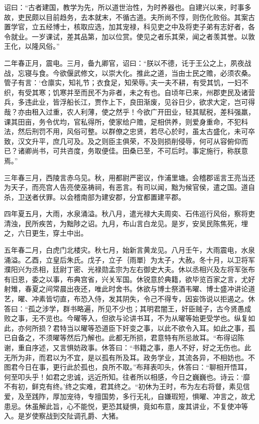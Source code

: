 \documentclass[12pt,UTF8]{ctexbook}
\begin{document}
诏曰：“古者建国，教学为先，所以道世治性，为时养器也。自建兴以来，时事多故，吏民颇以目前趋务，去本就末，不循古道。夫所尚不惇，则伤化败俗。其案古置学官，立五经博士，核取应选，加其宠禄，科见吏之中及将吏子弟有志好者，各令就业。一岁课试，差其品第，加以位赏。使见之者乐其荣，闻之者羡其誉。以敦王化，以隆风俗。”

二年春正月，震电。三月，备九卿官，诏曰：“朕以不德，讬于王公之上，夙夜战战，忘寝与食。今欲偃武修文，以崇大化。推此之道，当由士民之赡，必须农桑。管子有言：‘仓廪实，知礼节；衣食足，知荣辱。’夫一夫不耕，有受其饥，一妇不织，有受其寒；饥寒并至而民不为非者，未之有也。自顷年已来，州郡吏民及诸营兵，多违此业，皆浮船长江，贾作上下，良田渐废，见谷日少，欲求大定，岂可得哉？亦由租入过重，农人利薄，使之然乎！今欲广开田业，轻其赋税，差科强羸，课其田亩，务令优均，官私得所，使家给户赡，足相供养，则爱身重命，不犯科法，然后刑罚不用，风俗可整。以群僚之忠贤，若尽心於时，虽太古盛化，未可卒致，汉文升平，庶几可及。及之则臣主俱荣，不及则损削侵辱，何可从容俯仰而已？诸卿尚书，可共咨度，务取便佳。田桑已至，不可后时。事定施行，称朕意焉。”

三年春三月，西陵言赤乌见。秋，用都尉严密议，作浦里塘。会稽郡谣言王亮当还为天子，而亮宫人告亮使巫祷祠，有恶言。有司以闻，黜为候官侯，遣之国。道自杀，卫送者伏罪。以会稽南部为建安郡，分宜都置建平郡。

四年夏五月，大雨，水泉涌溢。秋八月，遣光禄大夫周奕、石伟巡行风俗，察将吏清浊，民所疾苦，为黜陟之诏。九月，布山言白龙见。是岁，安吴民陈焦死，埋之，六日更生，穿土中出。

五年春二月，白虎门北楼灾。秋七月，始新言黄龙见。八月壬午，大雨震电，水泉涌溢。乙酉，立皇后朱氏。戊子，立子｛雨單｝为太子，大赦。冬十月，以卫将军濮阳兴为丞相，廷尉丁密、光禄勋孟宗为左右御史大夫。休以丞相兴及左将军张布有旧恩，委之以事，布典宫省，兴关军国。休锐意於典籍，欲毕览百家之言，尤好射雉，春夏之间常晨出夜还，唯此时舍书。休欲与博士祭酒韦曜、博士盛冲讲论道艺，曜、冲素皆切直，布恐入侍，发其阴失，令己不得专，因妄饰说以拒遏之。休答曰：“孤之涉学，群书略遍，所见不少也；其明君闇王，奸臣贼子，古今贤愚成败之事，无不览也。今曜等入，但欲与论讲书耳，不为从曜等始更受学也。纵复如此，亦何所损？君特当以曜等恐道臣下奸变之事，以此不欲令入耳。如此之事，孤已自备之，不须曜等然后乃解也。此都无所损，君意特有所忌故耳。“布得诏陈谢，重自序述，又言惧妨政事。休答曰：“书籍之事，患人不好，好之无伤也。此无所为非，而君以为不宜，是以孤有所及耳。政务学业，其流各异，不相妨也。不图君今日在事，更行此於孤也，良所不取。”布拜表叩头，休答曰：“聊相开悟耳，何至叩头乎！如君之忠诚，远近所知。往者所以相感，今日之巍巍也。诗云：‘靡不有初，鲜克有终。’终之实难，君其终之。“初休为王时，布为左右将督，素见信爱，及至践阼，厚加宠待，专擅国势，多行无礼，自嫌瑕短，惧曜、冲言之，故尤患忌。休虽解此旨，心不能悦，更恐其疑惧，竟如布意，废其讲业，不复使冲等入。是岁使察战到交阯调孔爵、大猪。
\end{document}
